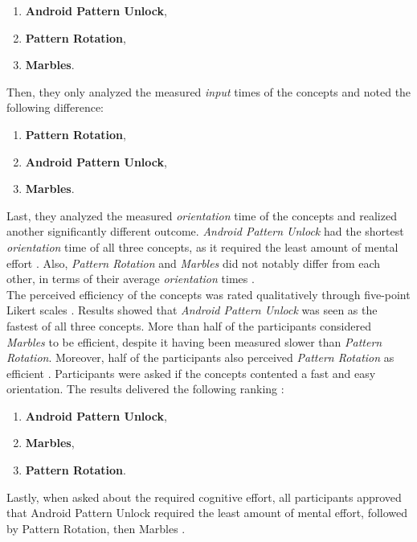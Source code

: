 \begin{enumerate}
    \item \textbf{Android Pattern Unlock},
    \item \textbf{Pattern Rotation},
    \item \textbf{Marbles}.
\end{enumerate} 

Then, they only analyzed the measured \textit{input} times of the concepts and  noted the following difference:

\begin{enumerate}
    \item \textbf{Pattern Rotation},
    \item \textbf{Android Pattern Unlock},
    \item \textbf{Marbles}.
\end{enumerate}

Last, they analyzed the measured \textit{orientation} time of the concepts and realized another significantly different outcome. \textit{Android Pattern Unlock} had the shortest \textit{orientation} time of all three concepts, as it required the least amount of mental effort   \cite{Zezschwitz}. Also, \textit{Pattern Rotation} and \textit{Marbles} did not notably differ from each other, in terms of their average \textit{orientation} times \cite{Zezschwitz}. \\


The perceived efficiency of the concepts was rated qualitatively through five-point Likert scales \cite{Zezschwitz}. Results showed that \textit{Android Pattern Unlock} was seen as the fastest of all three concepts. More than half of the participants considered \textit{Marbles} to be efficient, despite it having been measured slower than \textit{Pattern Rotation}. Moreover, half of the participants also perceived \textit{Pattern Rotation} as efficient \cite{Zezschwitz}. Participants were asked if the concepts contented a fast and easy orientation. The results delivered the following ranking \cite{Zezschwitz}: 

\begin{enumerate}
     \item \textbf{Android Pattern Unlock},
    \item \textbf{Marbles},
    \item \textbf{Pattern Rotation}.
\end{enumerate}

Lastly, when asked about the required cognitive effort, all participants approved that Android Pattern Unlock required the least amount of mental effort, followed by Pattern Rotation, then Marbles \cite{Zezschwitz}. \\


